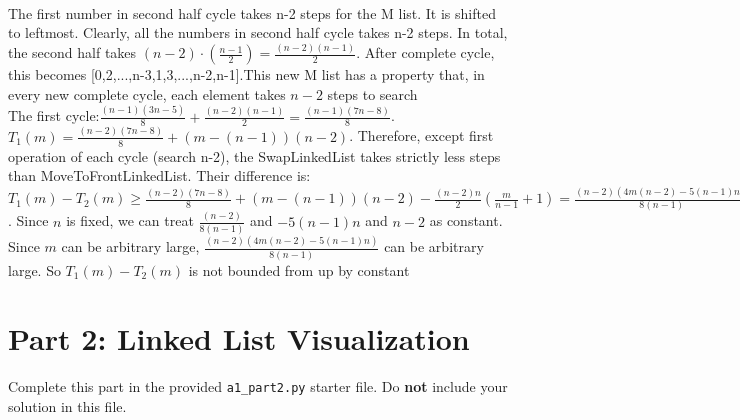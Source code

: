 \documentclass[fontsize=11pt]{article}
\begin{document}
\begin{enumerate}
\\The first number in second half cycle takes n-2 steps for the M list. It is shifted to leftmost. Clearly, all the numbers in second half cycle takes n-2 steps. In total, the second half takes $(n-2)\cdot (\frac{n-1}{2})=\frac{(n-2)(n-1)}{2}$. After complete cycle, this becomes [0,2,...,n-3,1,3,...,n-2,n-1].This new M list has a property that, in every new complete cycle, each element takes $n-2$ steps to search
\\The first cycle:$\frac{(n-1)(3n-5)}{8}+\frac{(n-2)(n-1)}{2}=\frac{(n-1)(7n-8)}{8}$.
\\$T_1(m)= \frac{(n-2)(7n-8)}{8}+(m-(n-1))(n-2)$.
Therefore, except first operation of each cycle (search n-2), the SwapLinkedList takes strictly less steps than MoveToFrontLinkedList. Their difference is:
\\$T_1(m)-T_2(m)\geq \frac{(n-2)(7n-8)}{8}+(m-(n-1))(n-2)-\frac{(n-2)n}{2}(\frac{m}{n-1}+1)=
\frac{(n-2)(4m(n-2)-5(n-1)n)}{8(n-1)}$. Since $n$ is fixed, we can treat $\frac{(n-2)}{8(n-1)}$ and $-5(n-1)n$ and $n-2$ as constant. Since $m$ can be arbitrary large, $\frac{(n-2)(4m(n-2)-5(n-1)n)}{8(n-1)}$ can be arbitrary large. So $T_1(m)-T_2(m)$ is not bounded from up by constant


\end{enumerate}

\section*{Part 2: Linked List Visualization}
Complete this part in the provided \texttt{a1\_part2.py} starter file.
Do \textbf{not} include your solution in this file.
\end{document}
